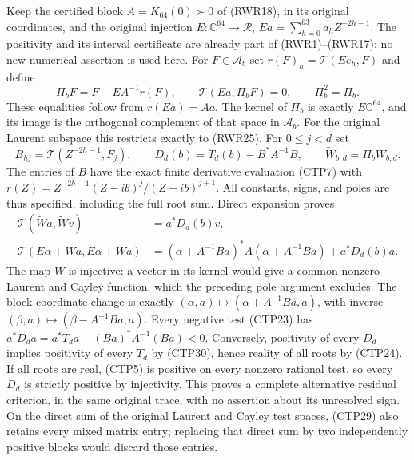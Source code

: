 Keep the certified block $A=K_{64}(0)\succ0$ of (RWR18), in its
original coordinates, and the original injection
$E:\mathbb C^{64}\to\mathscr R$, $Ea=\sum_{h=0}^{63}a_hZ^{-2h-1}$.
The positivity and its interval certificate are already part of
(RWR1)--(RWR17); no new numerical assertion is used here.
For $F\in\mathscr A_b$ set $r(F)_h=\mathcal T(Ee_h,F)$ and define
\begin{equation}\tag{CTP29}
 \Pi_bF=F-EA^{-1}r(F),\qquad
 \mathcal T(Ea,\Pi_bF)=0,\qquad \Pi_b^2=\Pi_b.
\end{equation}
These equalities follow from $r(Ea)=Aa$. The kernel of $\Pi_b$
is exactly $E\mathbb C^{64}$, and its image is the orthogonal
complement of that space in $\mathscr A_b$. For the original
Laurent subspace this restricts exactly to (RWR25).
For $0\le j<d$ set
\begin{equation}\tag{CTP30}
 B_{hj}=\mathcal T(Z^{-2h-1},F_j),\qquad
 D_d(b)=T_d(b)-B^*A^{-1}B,\qquad
 \widetilde W_{b,d}=\Pi_bW_{b,d}.
\end{equation}
The entries of $B$ have the exact finite derivative evaluation
(CTP7) with
$r(Z)=Z^{-2h-1}(Z-ib)^j/(Z+ib)^{j+1}$.
All constants, signs, and poles are thus specified, including
the full root sum. Direct expansion proves
\begin{equation}\tag{CTP31}
\begin{split}
 \mathcal T(\widetilde W a,\widetilde W v)&=a^*D_d(b)v,\\
 \mathcal T(E\alpha+W a,E\alpha+W a)
  &=(\alpha+A^{-1}Ba)^*A(\alpha+A^{-1}Ba)+a^*D_d(b)a.
\end{split}
\end{equation}
The map $\widetilde W$ is injective: a vector in its kernel
would give a common nonzero Laurent and Cayley function,
which the preceding pole argument excludes. The block coordinate
change is exactly $(\alpha,a)\mapsto(\alpha+A^{-1}Ba,a)$,
with inverse $(\beta,a)\mapsto(\beta-A^{-1}Ba,a)$.
Every negative test (CTP23) has
$a^*D_da=a^*T_da-(Ba)^*A^{-1}(Ba)<0$.
Conversely, positivity of every $D_d$ implies positivity of every
$T_d$ by (CTP30), hence reality of all roots by (CTP24).
If all roots are real, (CTP5) is positive on every nonzero rational
test, so every $D_d$ is strictly positive by injectivity.
This proves a complete alternative residual criterion, in the
same original trace, with no assertion about its unresolved sign.
On the direct sum of the original Laurent and Cayley test spaces,
(CTP29) also retains every mixed matrix entry; replacing that direct
sum by two independently positive blocks would discard those entries.

